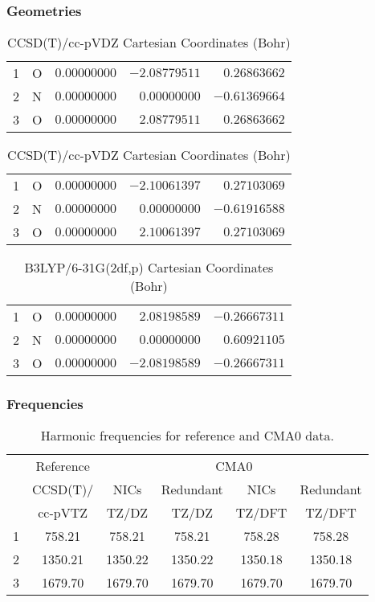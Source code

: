 \documentclass[10pt,oneside]{article}
\begin{document}
\begin{table}[h!]
\subsubsection*{Geometries}
\begin{multicols}{2}
\centering
\caption{CCSD(T)/cc-pVTZ Cartesian Coordinates (Bohr)}
\begin{tabular}{llrrr}
\toprule
1  & O  & $ 0.00000000$ & $-2.08779511$ & $ 0.26863662$ \\
2  & N  & $ 0.00000000$ & $ 0.00000000$ & $-0.61369664$ \\
3  & O  & $ 0.00000000$ & $ 2.08779511$ & $ 0.26863662$ \\
\bottomrule
\end{tabular}
\caption{CCSD(T)/cc-pVDZ Cartesian Coordinates (Bohr)}
\begin{tabular}{llrrr}
\toprule
1  & O  & $ 0.00000000$ & $-2.10061397$ & $ 0.27103069$ \\
2  & N  & $ 0.00000000$ & $ 0.00000000$ & $-0.61916588$ \\
3  & O  & $ 0.00000000$ & $ 2.10061397$ & $ 0.27103069$ \\
\bottomrule
\end{tabular}
\end{multicols}
\end{table}

\begin{table}[h]
\centering
\caption{B3LYP/6-31G(2df,p) Cartesian Coordinates (Bohr)}
\begin{tabular}{llrrr}
\toprule
1  & O  & $ 0.00000000$ & $ 2.08198589$ & $-0.26667311$ \\
2  & N  & $ 0.00000000$ & $ 0.00000000$ & $ 0.60921105$ \\
3  & O  & $ 0.00000000$ & $-2.08198589$ & $-0.26667311$ \\
\bottomrule
\end{tabular}
\end{table}

\begin{table}[h!]
\subsubsection*{Frequencies}
\centering
\caption{Harmonic frequencies for reference and CMA0 data.}
\begin{tabular}{cccccc}
\toprule
{} & Reference & \multicolumn{4}{c}{CMA0} \\
{} &  CCSD(T)/ &    NICs &  Redundant &    NICs & Redundant \\
{} &   cc-pVTZ &   TZ/DZ &      TZ/DZ &  TZ/DFT &    TZ/DFT \\
\midrule
1 &    758.21 &  758.21 &     758.21 &  758.28 &    758.28 \\
2 &   1350.21 & 1350.22 &    1350.22 & 1350.18 &   1350.18 \\
3 &   1679.70 & 1679.70 &    1679.70 & 1679.70 &   1679.70 \\
\bottomrule
\end{tabular}
\end{table}
\end{document}

